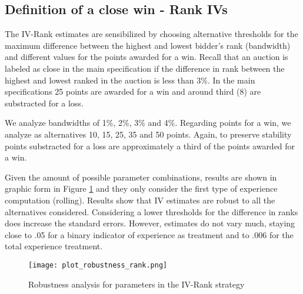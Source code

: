 

\subsection{Definition of a close win - Rank IVs}
The IV-Rank estimates are sensibilized by choosing alternative thresholds for the maximum difference between the highest and lowest bidder's rank (bandwidth) and different values for the points awarded for a win. Recall that an auction is labeled as close in the main specification if the difference in rank between the highest and lowest ranked in the auction is less than 3\%. In the main specifications 25 points are awarded for a win and around third (8) are substracted for a loss.

We analyze bandwidths of 1\%, 2\%, 3\% and 4\%. Regarding points for a win, we analyze as alternatives 10, 15, 25, 35 and 50 points. Again, to preserve stability points substracted for a loss are approximately a third of the points awarded for a win.

Given the amount of possible parameter combinations, results are shown in graphic form in Figure \ref{fig:plot_robustness_rank} and they only consider the first type of experience computation (rolling). Results show that IV estimates are robust to all the alternatives considered. Considering a lower thresholds for the difference in ranks does increase the standard errors. However, estimates do not vary much, staying close to .05 for a binary indicator of experience as treatment and to .006 for the total experience treatment.

\begin{figure}[H]
  \texttt{[image: plot\_robustness\_rank.png]}
  \caption{Robustness analysis for parameters in the IV-Rank strategy}
  \label{fig:plot_robustness_rank}
\end{figure}
